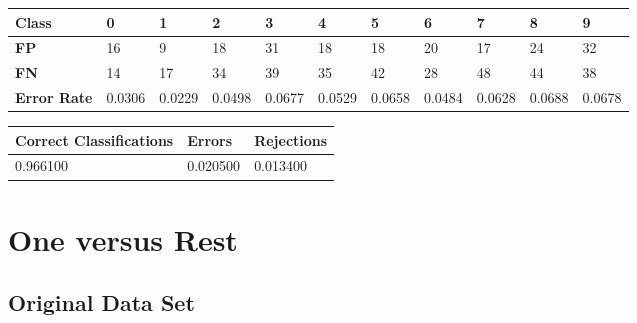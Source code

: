 \documentclass[
  a4paper,            %
  DIV=10,             %
  oneside,            %
  BCOR=5mm,           %
  parskip=half,       %
  numbers=noenddot,   %
  bibtotoc,           %
  listof=totoc,        %
  article
]{scrreprt}
\begin{document}
\begin{center}
  \begin{tabular}{|p{1cm}|p{1cm}|p{1cm}|p{1cm}|p{1cm}|p{1cm}|p{1cm}|p{1cm}|p{1cm}|p{1cm}|p{1cm}|}
    \hline
    \textbf{Class} & \textbf{0} & \textbf{1} & \textbf{2} & \textbf{3} & \textbf{4} & \textbf{5} & \textbf{6} & \textbf{7} & \textbf{8} & \textbf{9} \\
    \hline
    \textbf{FP} & 16 & 9 & 18 & 31 & 18 & 18 & 20 & 17 & 24 & 32 \\
    \hline
    \textbf{FN} & 14 & 17 & 34 & 39 & 35 & 42 & 28 & 48 & 44 & 38 \\
    \hline
    \textbf{Error Rate} & 0.0306 & 0.0229 & 0.0498 & 0.0677 & 0.0529 & 0.0658 & 0.0484 & 0.0628 & 0.0688 & 0.0678 \\
    \hline
  \end{tabular}
\end{center}

\begin{center}
  \begin{tabular}{|p{5cm}|p{3cm}|p{3cm}|}
    \hline
    \textbf{Correct Classifications} & \textbf{Errors} & \textbf{Rejections} \\
    \hline
    0.966100 & 0.020500 & 0.013400 \\
    \hline
  \end{tabular}
\end{center}
\section{One versus Rest}
\subsection{Original Data Set}
\end{document}

